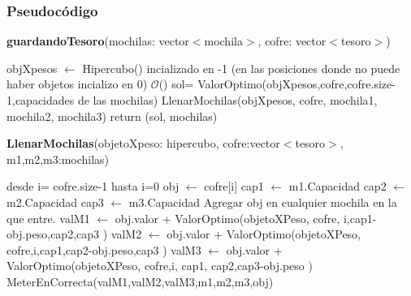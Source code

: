 \documentclass[spanish,12pt]{article}
\begin{document}
\subsubsection{Pseudocódigo}

\begin{algorithm}[H]{\textbf{guardandoTesoro}(mochilas: vector$<$mochila$>$, cofre: vector$<$tesoro$>$)}
	\begin{algorithmic}[1]
		\State objXpesos $\gets$ Hipercubo() incializado en -1 \Comment (en las posiciones donde no puede haber objetos incializo en 0) $\mathcal{O}$()
		\State sol= ValorOptimo(objXpesos,cofre,cofre.size-1,capacidades de las mochilas)
		\State LlenarMochilas(objXpesos, cofre, mochila1, mochila2, mochila3)
		\State return (sol, mochilas)
	\end{algorithmic}
\end{algorithm}



\begin{algorithm}[H]{\textbf{LlenarMochilas}(objetoXpeso: hipercubo, cofre:vector$<$tesoro$>$, m1,m2,m3:mochilas)}
	\begin{algorithmic}[1]
		\State desde i= cofre.size-1 hasta i=0
			\State obj $\gets$ cofre[i]
			\State cap1 $\gets$ m1.Capacidad
			\State cap2 $\gets$ m2.Capacidad
			\State cap3 $\gets$ m3.Capacidad
				\State Agregar obj en cualquier mochila en la que entre.
			\Else
				\State valM1 $\gets$ obj.valor + ValorOptimo(objetoXPeso, cofre, i,cap1-obj.peso,cap2,cap3 )
				\State valM2 $\gets$ obj.valor + ValorOptimo(objetoXPeso, cofre,i,cap1,cap2-obj.peso,cap3 )
				\State valM3 $\gets$ obj.valor + ValorOptimo(objetoXPeso, cofre,i, cap1, cap2,cap3-obj.peso )
				\State MeterEnCorrecta(valM1,valM2,valM3,m1,m2,m3,obj)
			\EndIf

	\end{algorithmic}
\end{algorithm}



\end{document}
